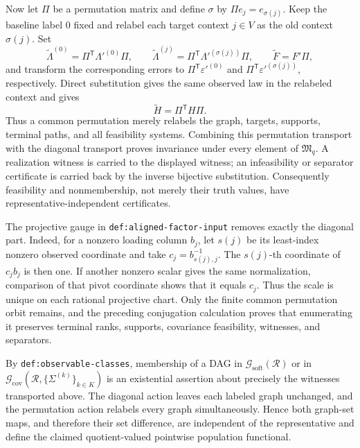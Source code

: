Now let \(\Pi\) be a permutation matrix and define \(\sigma\) by
\(\Pi e_j=e_{\sigma(j)}\).  Keep the baseline label \(0\) fixed and relabel each
target context \(j\in V\) as the old context \(\sigma(j)\).  Set
\[
 \widetilde\Lambda^{(0)}=\Pi^{\mathsf T}\Lambda'^{(0)}\Pi,
 \qquad
 \widetilde\Lambda^{(j)}=\Pi^{\mathsf T}\Lambda'^{(\sigma(j))}\Pi,
 \qquad
 \widetilde F=F'\Pi,
\]
and transform the corresponding errors to \(\Pi^{\mathsf T}\varepsilon'^{(0)}\)
and \(\Pi^{\mathsf T}\varepsilon'^{(\sigma(j))}\), respectively.  Direct
substitution gives the same observed law in the relabeled context and gives
\[
 \widetilde H=\Pi^{\mathsf T}H\Pi.
\]
Thus a common permutation merely relabels the graph, targets, supports, terminal
paths, and all feasibility systems.  Combining this permutation transport with
the diagonal transport proves invariance under every element of
\(\mathfrak M_q\).  A realization witness is carried to the displayed witness;
an infeasibility or separator certificate is carried back by the inverse
bijective substitution.  Consequently feasibility and nonmembership, not merely
their truth values, have representative-independent certificates.

The projective gauge in \texttt{def:aligned-factor-input} removes exactly the
diagonal part.  Indeed, for a nonzero loading column \(b_j\), let \(s(j)\) be its
least-index nonzero observed coordinate and take
\(c_j=b_{s(j),j}^{-1}\).  The \(s(j)\)-th coordinate of \(c_jb_j\) is then one.
If another nonzero scalar gives the same normalization, comparison of that pivot
coordinate shows that it equals \(c_j\).  Thus the scale is unique on each
rational projective chart.  Only the finite common permutation orbit remains,
and the preceding conjugation calculation proves that enumerating it preserves
terminal ranks, supports, covariance feasibility, witnesses, and separators.

By \texttt{def:observable-classes}, membership of a DAG in
\(\mathcal G_{\mathrm{soft}}(\mathcal R)\) or in
\(\mathcal G_{\mathrm{cov}}(\mathcal R,\{\Sigma^{(k)}\}_{k\in K})\) is an
existential assertion about precisely the witnesses transported above.  The
diagonal action leaves each labeled graph unchanged, and the permutation action
relabels every graph simultaneously.  Hence both graph-set maps, and therefore
their set difference, are independent of the representative and define the
claimed quotient-valued pointwise population functional.


